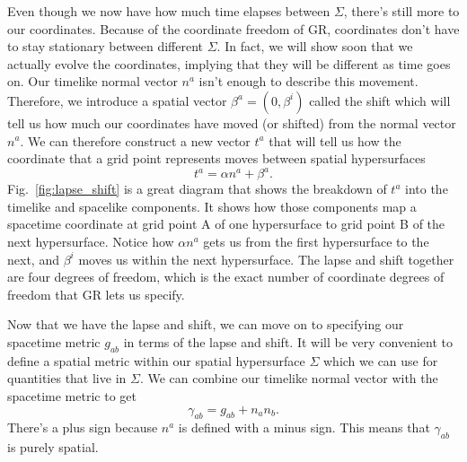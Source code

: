 \begin{bibunit}[unsrtnat]
Even though we now have how much time elapses between $\Sigma$, there's still
more to our coordinates. Because of the coordinate freedom of GR, coordinates
don't have to stay stationary between different $\Sigma$. In fact, we will show
soon that we actually evolve the coordinates, implying that they will be
different as time goes on. Our timelike normal vector $n^a$ isn't enough
to describe this movement. Therefore, we introduce a spatial vector
$\beta^a=(0,\beta^i)$ called the shift which will tell us how much our
coordinates have moved (or shifted) from the normal vector $n^a$. We can
therefore construct a new vector $t^a$ that will tell us how the coordinate that
a grid point represents moves between spatial hypersurfaces
\begin{equation}\label{eq:t_a}
   t^a = \alpha n^a + \beta^a .
\end{equation}
Fig.~\ref{fig:lapse_shift} is a great diagram that shows the breakdown of
$t^a$ into the timelike and spacelike components. It shows how those components
map a spacetime coordinate at grid point A of one hypersurface to grid point B
of the next hypersurface. Notice how $\alpha n^a$ gets us from the first
hypersurface to the next, and $\beta^i$ moves us within the next hypersurface.
The lapse and shift together are four degrees of freedom, which is the exact
number of coordinate degrees of freedom that GR lets us specify.

Now that we have the lapse and shift, we can move on to specifying our spacetime
metric $g_{ab}$ in terms of the lapse and shift. It will be very convenient to
define a spatial metric within our spatial hypersurface $\Sigma$ which we can
use for quantities that live in $\Sigma$. We can combine our timelike
normal vector with the spacetime metric to get
\begin{equation}\label{eq:spatial_metric}
   \gamma_{ab} = g_{ab} + n_a n_b .
\end{equation}
There's a plus sign because $n^a$ is defined with a minus sign. This means that
$\gamma_{ab}$ is purely spatial.


\end{bibunit}
